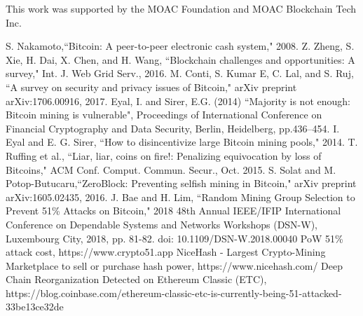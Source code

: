 \documentclass[conference]{IEEEtran}
\begin{document}
This work was supported by the MOAC Foundation and MOAC Blockchain Tech Inc.

\begin{thebibliography}{00}

 S. Nakamoto,``Bitcoin: A peer-to-peer electronic cash system," 2008.
 Z. Zheng, S. Xie, H. Dai, X. Chen, and H. Wang, ``Blockchain challenges
and opportunities: A survey," Int. J. Web Grid Serv., 2016.
M. Conti, S. Kumar E, C. Lal, and S. Ruj, ``A survey on security and privacy issues of Bitcoin," arXiv preprint arXiv:1706.00916, 2017.
 Eyal, I. and Sirer, E.G. (2014) ``Majority is not enough: Bitcoin mining is vulnerable", Proceedings
of International Conference on Financial Cryptography and Data Security, Berlin, Heidelberg,
pp.436–454.
 I. Eyal and E. G. Sirer, ``How to disincentivize large Bitcoin mining pools," 2014.
 T. Ruffing et al., “Liar, liar, coins on fire!: Penalizing equivocation by loss of Bitcoins," ACM Conf. Comput. Commun. Secur., Oct. 2015.
 S. Solat and M. Potop-Butucaru,``ZeroBlock: Preventing selfish mining in Bitcoin," arXiv preprint arXiv:1605.02435, 2016.
 J. Bae and H. Lim, ``Random Mining Group Selection to Prevent 51\% Attacks on Bitcoin," 2018 48th Annual IEEE/IFIP International Conference on Dependable Systems and Networks Workshops (DSN-W), Luxembourg City, 2018, pp. 81-82. 
doi: 10.1109/DSN-W.2018.00040
 PoW 51\% attack cost, https://www.crypto51.app
 NiceHash - Largest Crypto-Mining Marketplace to sell or purchase hash power, https://www.nicehash.com/
 Deep Chain Reorganization Detected on Ethereum Classic (ETC), https://blog.coinbase.com/ethereum-classic-etc-is-currently-being-51-attacked-33be13ce32de

\end{thebibliography}
\vspace{12pt}
\color{red}
\end{document}
